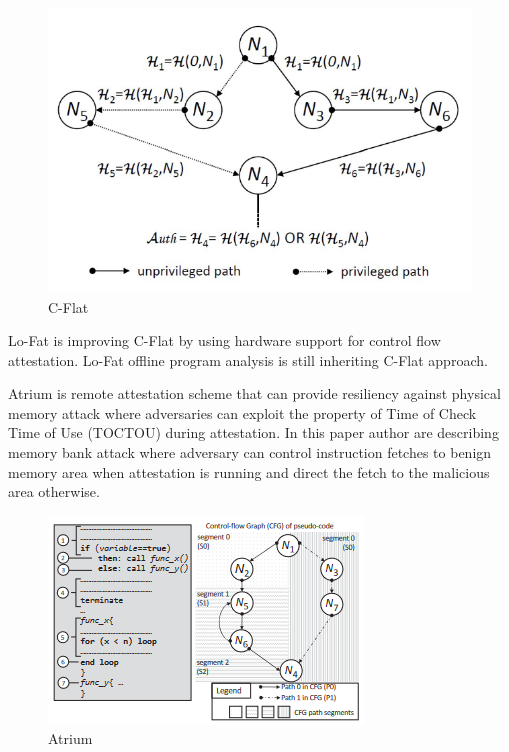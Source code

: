 \begin{figure}[htbp]
\centerline{\includegraphics[scale=.5]{Figures/01/cflat.png}}
\caption{C-Flat}
\label{fig:c-flat}
\end{figure}

Lo-Fat\cite{dessoukyLOFATLowOverheadControl2017} is improving C-Flat by using hardware support for control flow attestation. Lo-Fat offline program analysis is still inheriting C-Flat approach.

Atrium \cite{zeitouniATRIUMRuntimeAttestation2017} is remote attestation scheme that can provide resiliency against physical memory attack where adversaries can exploit the property of Time of Check Time of Use (TOCTOU) during attestation. In this paper author are describing memory bank attack where adversary can control instruction fetches to benign memory area when attestation is running and direct the fetch to the malicious area otherwise.

\begin{figure}[htbp]
\centerline{\includegraphics[scale=.5]{Figures/01/atrium.png}}
\caption{Atrium}
\label{fig:atrium}
\end{figure}

